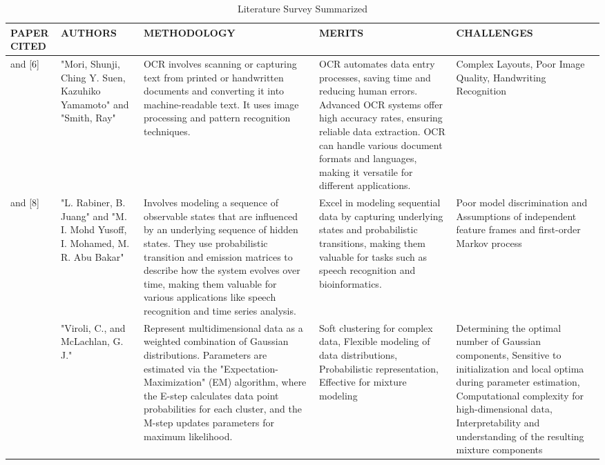 \documentclass[fleqn,10pt]{thescipub} %
\begin{document}
\baselineskip
\begin{table}
 \caption{Literature Survey Summarized}
\begin{center}
 \centering
  \small %
    \begin{tabular}{ |p{1cm}|p{2cm}|p{4cm}|p{4cm}|p{4cm}| }
\hline
\centering PAPER CITED & \centering  AUTHORS & \centering METHODOLOGY &  \centering MERITS &  \centering CHALLENGES \arraybackslash \\ 
\hline
[5] and [6]  &  "Mori, Shunji, Ching Y. Suen, Kazuhiko Yamamoto" and "Smith, Ray" &  OCR involves scanning or capturing text from printed or handwritten documents and converting it into machine-readable text. It uses image processing and pattern recognition techniques. &  OCR automates data entry processes, saving time and reducing human errors. Advanced OCR systems offer high accuracy rates, ensuring reliable data extraction. OCR can handle various document formats and languages, making it versatile for different applications. &  Complex Layouts, Poor Image Quality, Handwriting Recognition  \\
\hline
[7] and [8] &  "L. Rabiner, B. Juang" and "M. I. Mohd Yusoff, I. Mohamed, M. R. Abu Bakar" &  Involves modeling a sequence of observable states that are influenced by an underlying sequence of hidden states. They use probabilistic transition and emission matrices to describe how the system evolves over time, making them valuable for various applications like speech recognition and time series analysis. & Excel in modeling sequential data by capturing underlying states and probabilistic transitions, making them valuable for tasks such as speech recognition and bioinformatics. &  Poor model discrimination and Assumptions of independent feature frames and first-order Markov process  \\
\hline
[9] &  "Viroli, C., and McLachlan, G. J." & Represent multidimensional data as a weighted combination of Gaussian distributions. Parameters are estimated via the "Expectation-Maximization" (EM) algorithm, where the E-step calculates data point probabilities for each cluster, and the M-step updates parameters for maximum likelihood. &  Soft clustering for complex data, Flexible modeling of data distributions, Probabilistic representation, Effective for mixture modeling &  Determining the optimal number of Gaussian components, Sensitive to initialization and local optima during parameter estimation, Computational complexity for high-dimensional data, Interpretability and understanding of the resulting mixture components \\

\end{tabular}
\end{center}
\end{table}
\end{document}

